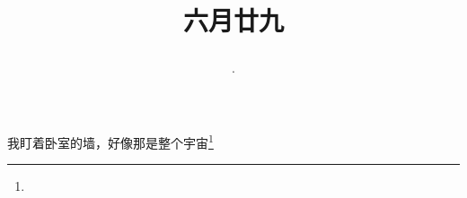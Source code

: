 \title{\date[d=3,m=8,y=2024][year:cn-y,年,month:cn,day:cn,日,·,weekday]·六月廿九 }
我盯着卧室的墙，好像那是整个宇宙\footnote{ }

